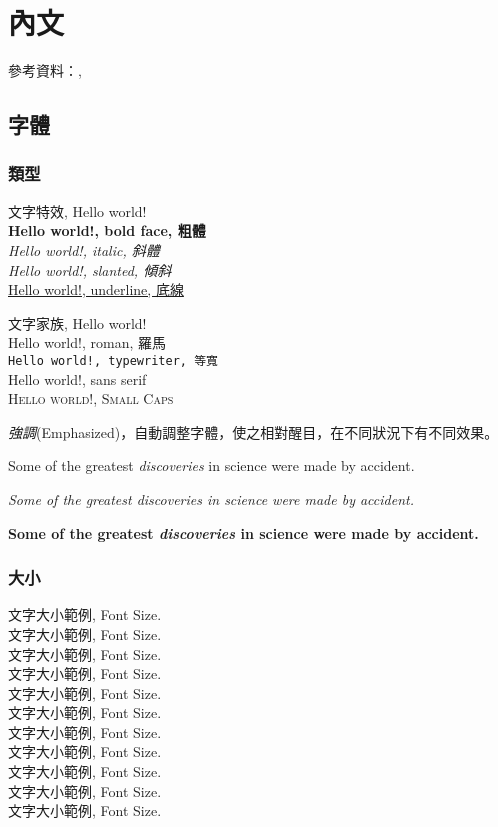 \chapter{內文} \label{ch_content}
參考資料：\cite{latex_basic}, \cite{latex_fbox}
\section{字體}
\subsection{類型}
文字特效, Hello world! \\
{\LARGE
\textbf{Hello world!, bold face, 粗體} \\
\textit{Hello world!, italic, 斜體} \\
\textsl{Hello world!, slanted, 傾斜} \\
\underline{Hello world!, underline, 底線} \\
}

文字家族, Hello world! \\
{\LARGE
\textrm{Hello world!, roman, 羅馬} \\
\texttt{Hello world!, typewriter, 等寬} \\
\textsf{Hello world!, sans serif} \\
\textsc{Hello world!, Small Caps} \\
}

\emph{強調}(Emphasized)，自動調整字體，使之相對醒目，在不同狀況下有不同效果。

Some of the greatest \emph{discoveries} 
in science 
were made by accident.

\textit{Some of the greatest \emph{discoveries} 
in science 
were made by accident.}

\textbf{Some of the greatest \emph{discoveries} 
in science 
were made by accident.}

\subsection{大小}
文字大小範例, Font Size.\\
{\tiny 文字大小範例, Font Size.}\\
{\scriptsize 文字大小範例, Font Size.}\\
{\footnotesize 文字大小範例, Font Size.}\\
{\small 文字大小範例, Font Size.}\\
{\normalsize 文字大小範例, Font Size.}\\
{\large 文字大小範例, Font Size.}\\
{\Large 文字大小範例, Font Size.}\\
{\LARGE 文字大小範例, Font Size.}\\
{\huge 文字大小範例, Font Size.} \\
{\Huge 文字大小範例, Font Size.}


